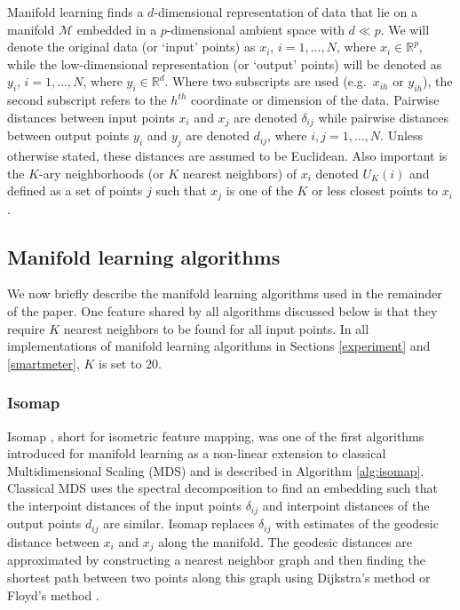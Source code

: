 \documentclass[11pt,a4paper,]{article}
\begin{document}
Manifold learning finds a \(d\)-dimensional representation of data that lie on a manifold \(\mathcal{M}\) embedded in a \(p\)-dimensional ambient space with \(d \ll p\). We will denote the original data (or `input' points) as \(x_i\), \(i=1,\dots,N\), where \(x_i\in\mathbb{R}^p\), while the low-dimensional representation (or `output' points) will be denoted as \(y_i\), \(i=1,\dots,N\), where \(y_i\in\mathbb{R}^d\). Where two subscripts are used (e.g.~\(x_{ih}\) or \(y_{ih}\)), the second subscript refers to the \(h^{th}\) coordinate or dimension of the data. Pairwise distances between input points \(x_i\) and \(x_j\) are denoted \(\delta_{ij}\) while pairwise distances between output points \(y_i\) and \(y_j\) are denoted \(d_{ij}\), where \(i,j=1,\dots,N\). Unless otherwise stated, these distances are assumed to be Euclidean. Also important is the \(K\)-ary neighborhoods (or \(K\) nearest neighbors) of \(x_i\) denoted \(U_K(i)\) and defined as a set of points \(j\) such that \(x_j\) is one of the \(K\) or less closest points to \(x_i\).

\hypertarget{ml}{%
\subsection{Manifold learning algorithms}\label{ml}}

We now briefly describe the manifold learning algorithms used in the remainder of the paper. One feature shared by all algorithms discussed below is that they require \(K\) nearest neighbors to be found for all input points. In all implementations of manifold learning algorithms in Sections \ref{experiment} and \ref{smartmeter}, \(K\) is set to 20.

\hypertarget{isomap}{%
\subsubsection*{Isomap}\label{isomap}}

Isomap \autocite{Tenenbaum2000-fr}, short for isometric feature mapping, was one of the first algorithms introduced for manifold learning as a non-linear extension to classical Multidimensional Scaling (MDS) and is described in Algorithm \ref{alg:isomap}. Classical MDS uses the spectral decomposition to find an embedding such that the interpoint distances of the input points \(\delta_{ij}\) and interpoint distances of the output points \(d_{ij}\) are similar. Isomap replaces \(\delta_{ij}\) with estimates of the geodesic distance between \(x_i\) and \(x_j\) along the manifold. The geodesic distances are approximated by constructing a nearest neighbor graph and then finding the shortest path between two points along this graph using Dijkstra's method \autocite{Dijkstra1959-ml} or Floyd's method \autocite{Floyd1962-hx}.
\end{document}
